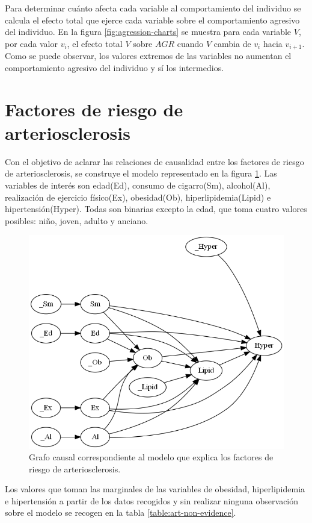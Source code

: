 Para determinar cuánto afecta cada variable al comportamiento del individuo se calcula el efecto total que ejerce cada variable sobre el comportamiento agresivo del individuo. En la figura \ref{fig:agression-charts} se muestra para cada variable $V$, por cada valor $v_i$, el efecto total $V$ sobre $AGR$ cuando $V$ cambia de $v_i$ hacia $v_{i+1}$. Como se puede observar, los valores extremos de las variables no aumentan el comportamiento agresivo del individuo y sí los intermedios.

\section{Factores de riesgo de arteriosclerosis}
Con el objetivo de aclarar las relaciones de causalidad entre los factores de riesgo de arteriosclerosis, se construye el modelo representado en la figura \ref{fig:arteriosclerosis}.
Las variables de interés son edad(Ed), consumo de cigarro(Sm), alcohol(Al), realización de ejercicio físico(Ex), obesidad(Ob), hiperlipidemia(Lipid) e hipertensión(Hyper). Todas son binarias excepto la edad, que toma cuatro valores posibles: niño, joven, adulto y anciano.
\begin{figure}[h!]
	\includegraphics[width=\linewidth]{./images/Chapter-4/arteriosclerosis.png}
	\caption{Grafo causal correspondiente al modelo que explica los factores de riesgo de arteriosclerosis.}
	\label{fig:arteriosclerosis}
\end{figure}

Los valores que toman las marginales de las variables de obesidad, hiperlipidemia e hipertensión a partir de los datos recogidos y sin realizar ninguna observación sobre el modelo se recogen en la tabla \ref{table:art-non-evidence}.

